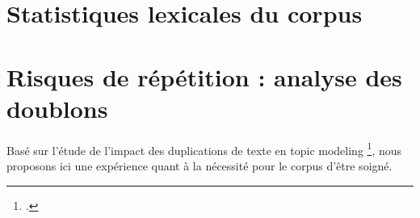 \section{Statistiques lexicales du corpus}
\label{subsec:corpus_lexical_stats}

\section{Risques de répétition : analyse des doublons}
\label{subsec:corpus_repetition}

Basé sur l'étude de l'impact des duplications de texte en topic modeling \footcite{schofield2017quantifying}, nous proposons ici une expérience
quant à la nécessité pour le corpus d'être soigné.